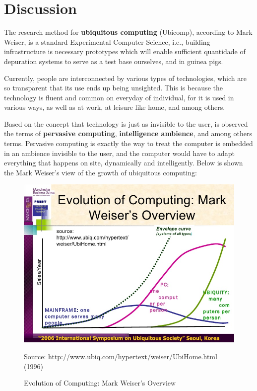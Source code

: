 \documentclass[a4paper,times,12pt]{article}
\begin{document}
\section{Discussion}
\par The research method for {\bf ubiquitous computing} (Ubicomp), according to Mark Weiser, is a standard 
Experimental Computer Science, i.e., building infrastructure is necessary prototypes which will enable sufficient quantidade of depuration systems to serve as a test base ourselves, and in guinea pigs.
\par Currently, people are interconnected by various types of technologies, which are so transparent that its use ends up being unsighted. This is because the technology is fluent and common on  everyday of individual, for it is used in various ways, as well as at work, at leisure like home, and among others.
\par Based on the concept that technology is just as invisible to the user, is observed the terms of {\bf pervasive computing}, {\bf intelligence ambience}, and among others terms. Pervasive computing is exactly the way to treat the computer is embedded in an ambience invisible to the user, and the computer would have to adapt everything that happens on site, dynamically and intelligently.  Below is shown the Mark Weiser's view of the growth of ubiquitous computing:
\begin{figure}[!ht]
  \centering
  \includegraphics[width=1\textwidth]{assets/images/img1}
  \caption{Evolution of Computing: Mark Weiser's Overview}{Source: http://www.ubiq.com/hypertext/weiser/UbiHome.html (1996)} \end{figure}
\end{document}
